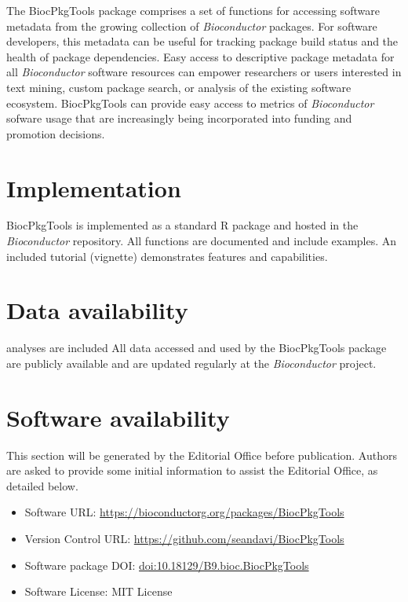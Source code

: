 \documentclass[9pt,a4paper]{extarticle}\usepackage[]{graphicx}\usepackage[]{color}
\begin{document}
The BiocPkgTools package comprises a set of functions for accessing
software metadata from the growing collection of \emph{Bioconductor}
packages. For software developers, this metadata can be useful for
tracking package build status and the health of package dependencies.
Easy access to descriptive package metadata for all
\emph{Bioconductor} software resources can empower researchers or
users interested in text mining, custom package search, or analysis of
the existing software ecosystem. BiocPkgTools can provide easy access
to metrics of \emph{Bioconductor} sofware usage that are increasingly
being incorporated into funding and promotion decisions.


\section*{Implementation}

BiocPkgTools is implemented as a standard R package and hosted in the
\emph{Bioconductor} repository. All functions are documented and include
examples. An included tutorial (vignette) demonstrates features and
capabilities.

\section*{Data availability} %
analyses are included All data accessed and used by the BiocPkgTools
package are publicly available and are updated regularly at the
\emph{Bioconductor} project.

\section*{Software availability}
This section will be generated by the Editorial Office before publication. Authors are asked to provide some initial information to assist the Editorial Office, as detailed below.
\begin{itemize}
\item Software URL: \href{https://bioconductor.org/packages/BiocPkgTools}{https://bioconductorg.org/packages/BiocPkgTools}
\item Version Control URL: \href{https://github.com/seandavi/BiocPkgTools}{https://github.com/seandavi/BiocPkgTools}
\item Software package DOI: \href{https://doi.org/doi:10.18129/B9.bioc.BiocPkgTools}{doi:10.18129/B9.bioc.BiocPkgTools}
\item Software License: MIT License
\end{itemize}
\end{document}
